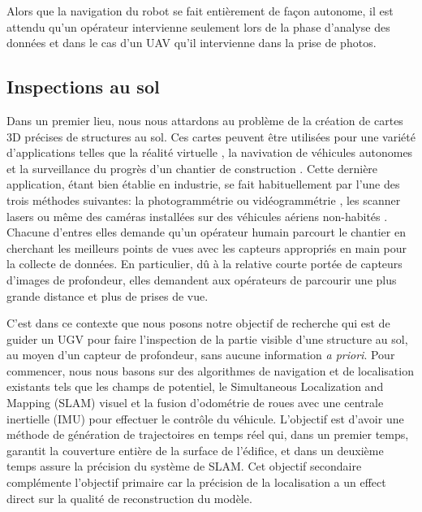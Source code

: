 Alors que la navigation du robot se fait entièrement de façon autonome, il est attendu qu'un opérateur intervienne seulement lors de la phase d'analyse des données et dans le cas d'un UAV qu'il intervienne dans la prise de photos.

\subsection{Inspections au sol}
Dans un premier lieu, nous nous attardons au problème de la création de cartes 3D précises de structures au sol. Ces cartes peuvent être utilisées pour une variété d'applications telles que la réalité virtuelle \citep{googlevr2017}, la navivation de véhicules autonomes \citep{deepmap2017} et la surveillance du progrès d'un chantier de construction \citep{Omar2018}. Cette dernière application, étant bien établie en industrie, se fait habituellement par l'une des trois méthodes suivantes: la photogrammétrie ou vidéogrammétrie \citep{BRILAKIS2011884}, les scanner lasers \citep{Turkan2012} ou même des caméras installées sur des véhicules aériens non-habités \citep{lin2015framework}. Chacune d'entres elles demande qu'un opérateur humain parcourt le chantier en cherchant les meilleurs points de vues avec les capteurs appropriés en main pour la collecte de données. En particulier, dû à la relative courte portée de capteurs d'images de profondeur, elles demandent aux opérateurs de parcourir une plus grande distance et plus de prises de vue.

C'est dans ce contexte que nous posons notre objectif de recherche qui est de guider un UGV pour faire l'inspection de la partie visible d'une structure au sol, au moyen d'un capteur de profondeur, sans aucune information \textit{a priori}. Pour commencer, nous nous basons sur des algorithmes de navigation et de localisation existants tels que les champs de potentiel, le Simultaneous Localization and Mapping (SLAM) visuel et la fusion d'odométrie de roues avec une centrale inertielle (IMU) pour effectuer le contrôle du véhicule. L'objectif est d'avoir une méthode de génération de trajectoires en temps réel qui, dans un premier temps, garantit la couverture entière de la surface de l'édifice, et dans un deuxième temps assure la précision du système de SLAM. Cet objectif secondaire complémente l'objectif primaire car la précision de la localisation a un effect direct sur la qualité de reconstruction du modèle.

